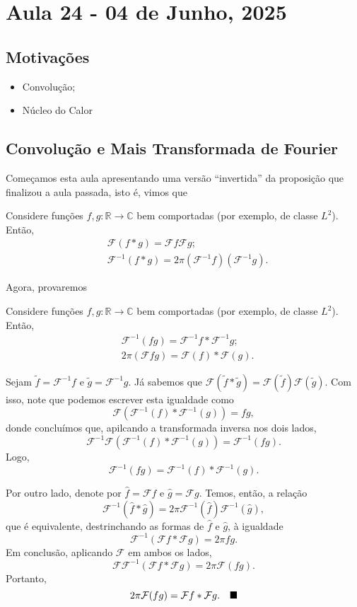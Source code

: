 \documentclass[../pde_notes.tex]{subfiles}
\begin{document}
\section{Aula 24 - 04 de Junho, 2025}
\subsection{Motivações}
\begin{itemize}
	\item Convolução;
	\item Núcleo do Calor
\end{itemize}
\subsection{Convolução e Mais Transformada de Fourier}
Começamos esta aula apresentando uma versão ``invertida'' da proposição que finalizou a aula passada, isto é, vimos que
\begin{prop*}
	Considere funções \(f, g:\mathbb{R}\rightarrow \mathbb{C}\) bem comportadas (por exemplo, de classe \(L^{2}\)). Então,
	\begin{align*}
		 & \mathcal{F}(f*g) = \mathcal{F}f \mathcal{F}g;                        \\
		 & \mathcal{F}^{-1}(f*g) = 2\pi (\mathcal{F}^{-1}f)(\mathcal{F}^{-1}g).
	\end{align*}
\end{prop*}
Agora, provaremos
\begin{prop*}
	Considere funções \(f, g:\mathbb{R}\rightarrow \mathbb{C}\) bem comportadas (por exemplo, de classe \(L^{2}\)). Então,
	\begin{align*}
		 & \mathcal{F}^{-1}(fg) = \mathcal{F}^{-1}f *\mathcal{F}^{-1}g; \\
		 & 2\pi (\mathcal{F}fg) = \mathcal{F}(f)*\mathcal{F}(g).
	\end{align*}
\end{prop*}
\begin{proof*}
	Sejam \(\tilde{f} = \mathcal{F}^{-1}f\) e \(\tilde{g} = \mathcal{F}^{-1}g\). Já sabemos que \(\mathcal{F}(\tilde{f}*\tilde{g}) = \mathcal{F}(\tilde{f})\mathcal{F}(\tilde{g})\). Com isso, note que podemos escrever esta igualdade como
	\[
		\mathcal{F}(\mathcal{F}^{-1}(f)*\mathcal{F}^{-1}(g)) =f g,
	\]
	donde concluímos que, apilcando a transformada inversa nos dois lados,
	\[
		\mathcal{F}^{-1}\mathcal{F}(\mathcal{F}^{-1}(f)*\mathcal{F}^{-1}(g)) = \mathcal{F}^{-1}(fg).
	\]
	Logo,
	\[
		\mathcal{F}^{-1}(fg) = \mathcal{F}^{-1}(f)*\mathcal{F}^{-1}(g).
	\]

	Por outro lado, denote por \(\hat{f} = \mathcal{F}f\) e \(\hat{g} = \mathcal{F}g\). Temos, então, a relação
	\[
		\mathcal{F}^{-1}(\hat{f}*\hat{g}) = 2\pi \mathcal{F}^{-1}(\hat{f}) \mathcal{F}^{-1}(\hat{g}),
	\]
	que é equivalente, destrinchando as formas de \(\hat{f}\) e \(\hat{g}\), à igualdade
	\[
		\mathcal{F}^{-1}(\mathcal{F}f * \mathcal{F}g) = 2\pi fg.
	\]
	Em conclusão, aplicando \(\mathcal{F}\) em ambos os lados,
	\[
		\mathcal{F}\mathcal{F}^{-1}(\mathcal{F}f*\mathcal{F}g) = 2\pi \mathcal{F}(fg).
	\]
	Portanto,
	\[
		2\pi \mathcal{F}(fg) = \mathcal{F}f * \mathcal{F}g. \quad \text{$\blacksquare$}
	\]
\end{proof*}
\end{document}
